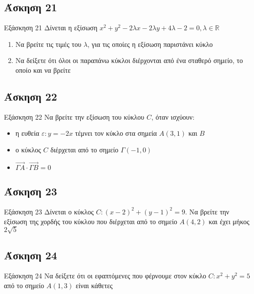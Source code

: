 \documentclass[greek]{beamer}
\begin{document}
\subsection{Άσκηση 21}
\begin{frame}[label=Άσκηση21,t]{Εξάσκηση 21}
  Δίνεται η εξίσωση $x^2+y^2-2λx-2λy+4λ-2=0,λ\in\mathbb{R}$
  \begin{enumerate}
    \item<1-> Να βρείτε τις τιμές του $λ$, για τις οποίες η εξίσωση παριστάνει κύκλο
    \item<2-> Να δείξετε ότι όλοι οι παραπάνω κύκλοι διέρχονται από ένα σταθερό σημείο, το οποίο και να βρείτε
  \end{enumerate}

\end{frame}

\subsection{Άσκηση 22}
\begin{frame}[label=Άσκηση22,t]{Εξάσκηση 22}
  Να βρείτε την εξίσωση του κύκλου $C$, όταν ισχύουν:
  \begin{itemize}
    \item η ευθεία $ε:y=-2x$ τέμνει τον κύκλο στα σημεία $Α(3,1)$ και $Β$
    \item ο κύκλος $C$ διέρχεται από το σημείο $Γ(-1,0)$
    \item $\overrightarrow{ΓΑ}\cdot\overrightarrow{ΓΒ}=0$
  \end{itemize}

\end{frame}

\subsection{Άσκηση 23}
\begin{frame}[label=Άσκηση23,t]{Εξάσκηση 23}
  Δίνεται ο κύκλος $C:(x-2)^2+(y-1)^2=9$. Να βρείτε την εξίσωση της χορδής του κύκλου που διέρχεται από το σημείο $Α(4,2)$ και έχει μήκος $2\sqrt{5}$

\end{frame}

\subsection{Άσκηση 24}
\begin{frame}[label=Άσκηση24,t]{Εξάσκηση 24}
  Να δείξετε ότι οι εφαπτόμενες που φέρνουμε στον κύκλο $C:x^2+y^2=5$ από το σημείο $Α(1,3)$ είναι κάθετες

\end{frame}
\end{document}
